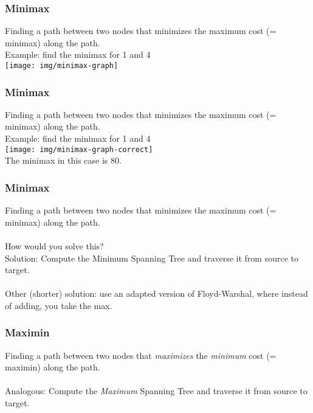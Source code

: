 \documentclass[12pt]{beamer}
\begin{document}
\begin{frame}
	\frametitle{Minimax}
	Finding a path between two nodes that minimizes the maximum cost (= minimax) along the path.\\
	Example: find the minimax for 1 and 4\\
	\texttt{[image: img/minimax-graph]}
\end{frame}

\begin{frame}
	\frametitle{Minimax}
	Finding a path between two nodes that minimizes the maximum cost (= minimax) along the path.\\
	Example: find the minimax for 1 and 4\\
	\texttt{[image: img/minimax-graph-correct]}\\
	The minimax in this case is 80.
\end{frame}

\begin{frame}
	\frametitle{Minimax}
	Finding a path between two nodes that minimizes the maximum cost (= minimax) along the path.\\~\\
	How would you solve this?\\ \pause
	Solution: Compute the Minimum Spanning Tree and traverse it from source to target.\\~\\
	\pause
	Other (shorter) solution: use an adapted version of Floyd-Warshal, where instead of adding, you take the max.
\end{frame}

\begin{frame}
	\frametitle{Maximin}
	Finding a path between two nodes that \textit{maximizes} the \textit{minimum} cost (= maximin) along the path.\\~\\ \pause
	Analogous: Compute the \textit{Maximum} Spanning Tree and traverse it from source to target.\\~\\
\end{frame}
\end{document}
